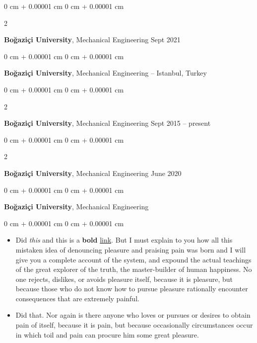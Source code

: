 \documentclass[10pt, letterpaper]{article}
\newenvironment{highlights}{
    \begin{itemize}[
        topsep=0.10 cm,
        parsep=0.10 cm,
        partopsep=0pt,
        itemsep=0pt,
        leftmargin=0 cm + 10pt
    ]
}{
    \end{itemize}
} %
\newenvironment{onecolentry}{
    \begin{adjustwidth}{
        0 cm + 0.00001 cm
    }{
        0 cm + 0.00001 cm
    }
}{
    \end{adjustwidth}
} %
\newenvironment{twocolentry}[2][]{
    \onecolentry
    \def\secondColumn{#2}
    \setcolumnwidth{\fill, 4.5 cm}
    \begin{paracol}{2}
}{
    \switchcolumn \raggedleft \secondColumn
    \end{paracol}
    \endonecolentry
} %
\begin{document}
        \vspace{0.2 cm}

        \begin{twocolentry}{
            Sept 2021
        }
            \textbf{Boğaziçi University}, Mechanical Engineering\end{twocolentry}



        \vspace{0.2 cm}

        \begin{onecolentry}
            \textbf{Boğaziçi University}, Mechanical Engineering -- Istanbul, Turkey\end{onecolentry}



        \vspace{0.2 cm}

        \begin{twocolentry}{
            Sept 2015 – present
        }
            \textbf{Boğaziçi University}, Mechanical Engineering\end{twocolentry}



        \vspace{0.2 cm}

        \begin{twocolentry}{
            June 2020
        }
            \textbf{Boğaziçi University}, Mechanical Engineering\end{twocolentry}



        \vspace{0.2 cm}

        \begin{onecolentry}
            \textbf{Boğaziçi University}, Mechanical Engineering\end{onecolentry}

        \vspace{0.10 cm}
        \begin{onecolentry}
            \begin{highlights}
                \item Did \textit{this} and this is a \textbf{bold} \href{https://example.com}{link}. But I must explain to you how all this mistaken idea of denouncing pleasure and praising pain was born and I will give you a complete account of the system, and expound the actual teachings of the great explorer of the truth, the master-builder of human happiness. No one rejects, dislikes, or avoids pleasure itself, because it is pleasure, but because those who do not know how to pursue pleasure rationally encounter consequences that are extremely painful.
                \item Did that. Nor again is there anyone who loves or pursues or desires to obtain pain of itself, because it is pain, but because occasionally circumstances occur in which toil and pain can procure him some great pleasure.
            \end{highlights}
        \end{onecolentry}
\end{document}
